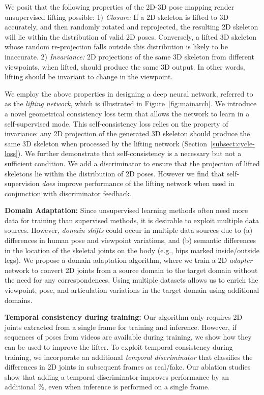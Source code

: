 \documentclass[10pt,twocolumn,letterpaper]{article}
\begin{document}
We posit that the following properties of the 2D-3D pose mapping render unsupervised lifting possible: 1) \textit{Closure:} If a 2D skeleton is lifted to 3D accurately, and then randomly rotated and reprojected, the resulting 2D skeleton will lie within the distribution of valid 2D poses. Conversely, a lifted 3D skeleton whose random re-projection falls outside this distribution is likely to be inaccurate. 2) \textit{Invariance:} 2D projections of the same 3D skeleton from different viewpoints, when lifted, should produce the same 3D output. In other words, lifting should be invariant to change in the viewpoint.

We employ the above properties in designing a deep neural network, referred to as the \textit{lifting network}, which is illustrated in Figure~\ref{fig:mainarch}. We introduce a novel geometrical consistency loss term that allows the network to learn in a self-supervised mode. This self-consistency loss relies on the property of invariance: any 2D projection of the generated 3D skeleton should produce the same 3D skeleton when processed by the lifting network (Section~\ref{subsect:cycle-loss}). We further demonstrate that self-consistency is a necessary but not a sufficient condition. We add a discriminator to ensure that the projection of lifted skeletons lie within the distribution of 2D poses.  However we find that self-supervision \textit{does} improve performance of the lifting network when used in conjunction with discriminator feedback.


\textbf{Domain Adaptation:} Since unsupervised learning methods often need more data for training than supervised methods, it is desirable to exploit multiple data sources. However, \textit{domain shifts} could occur in multiple data sources due to (a) differences in human pose and viewpoint variations, and (b) semantic differences in the location of the skeletal joints on the body (e.g., hips marked inside/outside legs).
We propose a domain adaptation algorithm, where we train a 2D \textit{adapter} network to convert 2D joints from a source domain to the target domain without the need for any correspondences.
Using multiple datasets allows us to enrich the viewpoint, pose, and articulation variations in the target domain using additional domains. 

\textbf{Temporal consistency during training:} Our algorithm only requires 2D joints extracted from a single frame for training and inference. However, if sequences of poses from videos are available during training, we show how they can be used to improve the lifter.
To exploit temporal consistency during training, we incorporate an additional \textit{temporal discriminator} that classifies the differences in 2D joints in subsequent frames as real/fake. Our ablation studies show that adding a temporal discriminator improves performance by an additional \%, even when inference is performed on a single frame.
\end{document}
